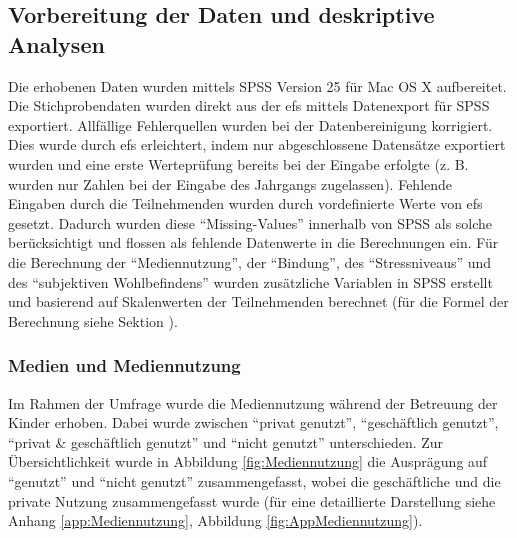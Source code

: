 \subsection{Vorbereitung der Daten und deskriptive Analysen}
Die erhobenen Daten wurden mittels SPSS Version 25 für Mac OS X aufbereitet. Die Stichprobendaten wurden direkt aus der \acrfull{efs} \cite{Questback2018} mittels Datenexport für SPSS exportiert. Allfällige Fehlerquellen wurden bei der Datenbereinigung korrigiert. Dies wurde durch \acrshort{efs} erleichtert, indem nur abgeschlossene Datensätze exportiert wurden und eine erste Werteprüfung bereits bei der Eingabe erfolgte (z. B. wurden nur Zahlen bei der Eingabe des Jahrgangs zugelassen). Fehlende Eingaben durch die Teilnehmenden wurden durch vordefinierte Werte von \acrshort{efs} gesetzt. Dadurch wurden diese \enquote{Missing-Values} innerhalb von SPSS als solche berücksichtigt und flossen als fehlende Datenwerte in die Berechnungen ein. Für die Berechnung der \enquote{Mediennutzung}, der \enquote{Bindung}, des \enquote{Stressniveaus} und des \enquote{subjektiven Wohlbefindens} wurden zusätzliche Variablen in SPSS erstellt und basierend auf Skalenwerten der Teilnehmenden berechnet (für die Formel der Berechnung siehe Sektion \textit{}).

\subsubsection{Medien und Mediennutzung}
Im Rahmen der Umfrage wurde die Mediennutzung während der Betreuung der Kinder erhoben. Dabei wurde zwischen \enquote{privat genutzt}, \enquote{geschäftlich genutzt}, \enquote{privat \& geschäftlich genutzt} und \enquote{nicht genutzt} unterschieden. Zur Übersichtlichkeit wurde in Abbildung \ref{fig:Mediennutzung} die Ausprägung auf \enquote{genutzt} und \enquote{nicht genutzt} zusammengefasst, wobei die geschäftliche und die private Nutzung zusammengefasst wurde (für eine detaillierte Darstellung siehe Anhang \ref{app:Mediennutzung}, Abbildung \ref{fig:AppMediennutzung}).

